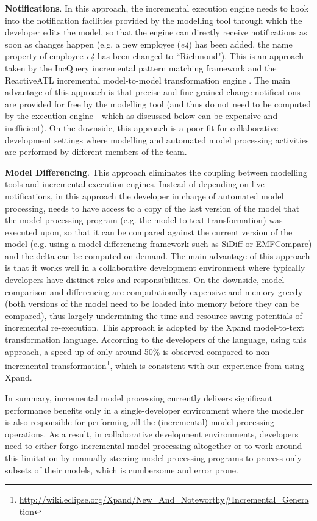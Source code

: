 \documentclass{llncs}
\begin{document}
\textbf{Notifications}. In this approach, the incremental execution engine needs to hook into the notification facilities provided by the modelling tool through which the developer edits the model, so that the engine can directly receive notifications as soon as changes happen (e.g. a new employee (\emph{e4}) has been added, the name property of employee \emph{e4} has been changed to ``Richmond"). This is an approach taken by the IncQuery incremental pattern matching framework \cite{rath2012derived} and the ReactiveATL incremental model-to-model transformation engine \cite{ogunyomi2015property}. The main advantage of this approach is that precise and fine-grained change notifications are provided for free by the modelling tool (and thus do not need to be computed by the execution engine---which as discussed below can be expensive and inefficient). On the downside, this approach is a poor fit for collaborative development settings where modelling and automated model processing activities are performed by different members of the team.

\textbf{Model Differencing}. This approach eliminates the coupling between modelling tools and incremental execution engines. Instead of depending on live notifications, in this approach the developer in charge of automated model processing, needs to have access to a copy of the last version of the model that the model processing program (e.g. the model-to-text transformation) was executed upon, so that it can be compared against the current version of the model (e.g. using a model-differencing framework such as SiDiff or EMFCompare) and the delta can be computed on demand. The main advantage of this approach is that it works well in a collaborative development environment where typically developers have distinct roles and responsibilities. On the downside, model comparison and differencing are computationally expensive and memory-greedy (both versions of the model need to be loaded into memory before they can be compared), thus largely undermining the time and resource saving potentials of incremental re-execution. This approach is adopted by the Xpand model-to-text transformation language. According to the developers of the language, using this approach, a speed-up of only around 50\% is observed compared to non-incremental transformation\footnote{\url{http://wiki.eclipse.org/Xpand/New_And_Noteworthy\#Incremental_Generation}}, which is consistent with our experience from using Xpand.

In summary, incremental model processing currently delivers significant performance benefits only in a single-developer environment where the modeller is also responsible for performing all the (incremental) model processing operations. As a result, in collaborative development environments, developers need to either forgo incremental model processing altogether or to work around this limitation by manually steering model processing programs to process only subsets of their models, which is cumbersome and error prone.
\end{document}
